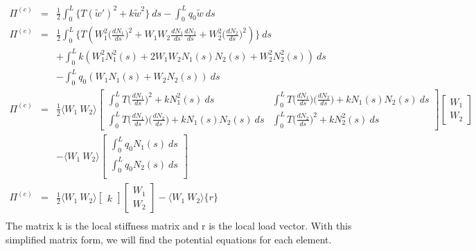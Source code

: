 \documentclass[a4paper]{article}
\begin{document}
\begin{eqnarray*}
\Pi^{(e)} & = & \frac{1}{2} \int_{0}^{L} \Big\{T(\widetilde{w}')^{2} + k \widetilde{w}^{2} \Big\} \ ds - \int_{0}^{L}q_{0}\widetilde{w} \ ds\\
\Pi^{(e)} & = & \frac{1}{2} \int_{0}^{L} \Big\{T(W_{1}^{2}\Big(\frac{d N_{1}}{ds}\Big)^{2}+W_{1}W_{2}\frac{d N_{1}}{ds}\frac{d N_{2}}{ds} + W_{2}^{2}\Big(\frac{d N_{2}}{ds}\Big)^{2}) \Big\} \ ds \\
& & + \int_{0}^{L} k (W_{1}^{2}N^{2}_{1}(s) + 2 W_{1}W_{2}N_{1}(s)N_{2}(s) + W_{2}^{2}N_{2}^{2}(s)) \ ds \\
& & -
\int_{0}^{L}q_{0}(W_{1}N_{1}(s)+W_{2}N_{2}(s)) \ ds\\
\Pi^{(e)} & = &
\frac{1}{2} \langle W_{1} \ W_{2}\rangle
\begin{bmatrix}
\int_{0}^{L}T\Big(\frac{dN_{1}}{ds} \Big)^{2} + kN_{1}^{2}(s) \ ds & \int_{0}^{L}T\Big(\frac{dN_{1}}{ds} \Big)\Big(\frac{dN_{2}}{ds} \Big) + kN_{1}(s)N_{2}(s) \ ds \\
\int_{0}^{L}T\Big(\frac{dN_{1}}{ds} \Big)\Big(\frac{dN_{2}}{ds} \Big) + kN_{1}(s)N_{2}(s) \ ds & 
\int_{0}^{L}T\Big(\frac{dN_{2}}{ds} \Big)^{2} + kN_{2}^{2}(s) \ ds
\end{bmatrix}
\begin{bmatrix}
W_{1}\\
W_{2}
\end{bmatrix}\\
& & - \langle W_{1} \ W_{2} \rangle 
\begin{bmatrix}
\int_{0}^{L}q_{0}N_{1}(s) \ ds\\[3pt]
\int_{0}^{L}q_{0}N_{2}(s) \ ds\\
\end{bmatrix}\\
\Pi^{(e)} & = & \frac{1}{2}\langle W_{1} \ W_{2} \rangle \begin{bmatrix}
k
\end{bmatrix} 
\begin{bmatrix}
W_{1} \\ W_{2}
\end{bmatrix} - \langle W_{1} \ W_{2} \rangle \{ r \} \\
\end{eqnarray*}
The matrix k is the local stiffness matrix and r is the local load vector. With this simplified matrix form, we will find the potential equations for each element.
\end{document}

